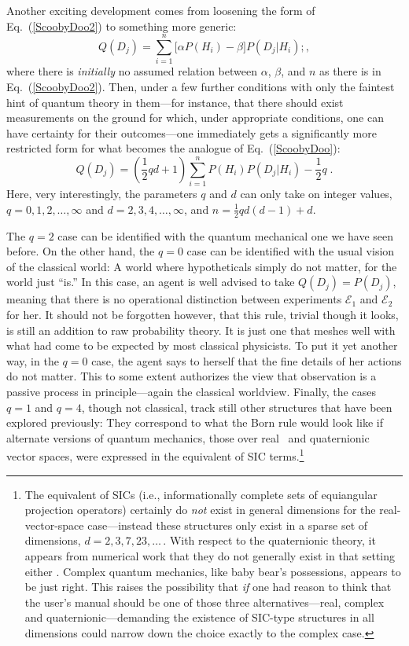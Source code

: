 \documentclass[aps,pra,superscriptaddress,12pt,tightenlines,nofootinbib]{revtex4-2}
\begin{document}
Another exciting development comes from loosening the form of Eq.~(\ref{ScoobyDoo2}) to something more generic:
\begin{equation}
Q(D_j)=\sum_{i=1}^n \big[\alpha P(H_i) -\beta\big] P(D_j|H_i);,
\end{equation}
where there is {\it initially\/} no assumed relation between $\alpha$, $\beta$, and $n$ as there is in Eq.~(\ref{ScoobyDoo2}).  Then, under a few further conditions with only the faintest hint of quantum theory in them---for instance, that there should exist measurements on the ground for which, under appropriate conditions, one can have certainty for their outcomes---one immediately gets a significantly more restricted form for what becomes the analogue of Eq.~(\ref{ScoobyDoo}):
\begin{equation}
Q(D_j)=\left(\frac{1}{2} qd+1\right)\sum_{i=1}^{n} P(H_i) P(D_j|H_i) - \frac12 q\;.
\label{ExNihiloOmnia}
\end{equation}
Here, very interestingly, the parameters $q$ and $d$ can only take on integer values, $q=0,1,2,\ldots,\infty$ and $d=2,3,4,\ldots,\infty$, and $n=\frac12 qd(d-1) + d$.

The $q=2$ case can be identified with the quantum me\-chanical one we have seen before.  On the other hand, the $q=0$ case can be identified with the usual vision of the classical world:  A world where hypotheticals simply do not matter, for the world just ``is.''  In this case, an agent is well advised to take $Q(D_j)=P(D_j)$, meaning that there is no operational distinction between experiments ${\mathcal E}_1$ and ${\mathcal E}_2$ for her. It should not be forgotten however, that this rule, trivial though it looks, is still an addition to raw probability theory.  It is just one that meshes well with what had come to be expected by most classical physicists.  To put it yet another way, in the $q=0$ case, the agent says to herself that the fine details of her actions do not matter. This to some extent authorizes the view that observation is a passive process in principle---again the classical worldview.  Finally, the cases $q=1$ and $q=4$, though not classical, track still other structures that have been explored previously:  They correspond to what the Born rule would look like if alternate versions of quantum mechanics, those over real~\cite{Stueckelberg60} and quaternionic~\cite{AdlerBook} vector spaces, were expressed in the equivalent of SIC terms.\footnote{The equivalent of SICs (i.e., informationally complete sets of equiangular projection operators) certainly do {\it not\/} exist in general dimensions for the real-vector-space case---instead these structures only exist in a sparse set of dimensions, $d=2,3,7,23,\ldots\,$. With respect to the quaternionic theory, it appears from numerical work that they do not generally exist in that setting either \cite{Khatirinejad08}.  Complex quantum mechanics, like baby bear's possessions, appears to be just right.  This raises the possibility that {\it if\/} one had reason to think that the user's manual should be one of those three alternatives---real, complex and quaternionic---demanding the existence of SIC-type structures in all dimensions could narrow down the choice exactly to the complex case.}
\end{document}
